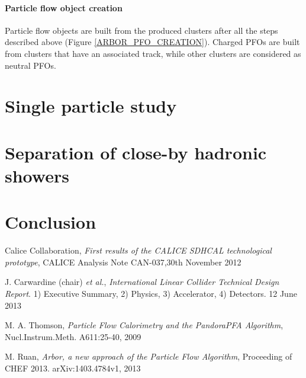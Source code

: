 \documentclass[cits]{JINST}
\begin{document}
\paragraph*{Particle flow object creation} Particle flow objects are built from the produced clusters after all the steps described above (Figure \ref{ARBOR_PFO_CREATION}). Charged PFOs are built from clusters that have an associated track, while other clusters are considered as neutral PFOs.

\section{Single particle study}



\section{Separation of close-by hadronic showers}


\section{Conclusion} 


\begin{thebibliography}{6}
\renewcommand{\hepex}[1]{\href{http://www.arxiv.org/abs/#1}{\tt hep-ex/#1}}
\renewcommand{\physics}[1]{\href{http://www.arxiv.org/abs/#1}{\tt phys.int-det/#1}}
\newcommand\nim[4]{\href{http://dx.doi.org/10.1016/#4}
  {\emph{Nucl.\ Instrum.\ Meth.} {\bf #1} (#2) #3}}



Calice Collaboration, \emph{First results of the CALICE SDHCAL technological prototype}, CALICE Analysis Note CAN-037,30th November 2012

J. Carwardine (chair) {\it et al.},  \emph{International Linear Collider Technical Design Report}. 1) Executive Summary, 2) Physics, 3) Accelerator, 4) Detectors. 12 June 2013

M. A. Thomson, \emph{Particle Flow Calorimetry and the PandoraPFA Algorithm}, Nucl.Instrum.Meth. A611:25-40, 2009


M. Ruan, \emph{Arbor, a new approach of the Particle Flow Algorithm}, Proceeding of CHEF 2013. arXiv:1403.4784v1, 2013

\newpage

\end{thebibliography}
\end{document}
